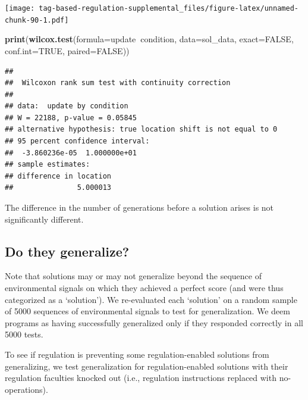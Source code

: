 \documentclass[]{book}
\newenvironment{Shaded}{\begin{snugshade}}{\end{snugshade}}
\newcommand{\DataTypeTok}[1]{\textcolor[rgb]{0.13,0.29,0.53}{#1}}
\newcommand{\KeywordTok}[1]{\textcolor[rgb]{0.13,0.29,0.53}{\textbf{#1}}}
\newcommand{\NormalTok}[1]{#1}
\newcommand{\OperatorTok}[1]{\textcolor[rgb]{0.81,0.36,0.00}{\textbf{#1}}}
\newcommand{\OtherTok}[1]{\textcolor[rgb]{0.56,0.35,0.01}{#1}}
\begin{document}
\texttt{[image: tag-based-regulation-supplemental\_files/figure-latex/unnamed-chunk-90-1.pdf]}

\begin{Shaded}
\begin{Highlighting}[]
\KeywordTok{print}\NormalTok{(}\KeywordTok{wilcox.test}\NormalTok{(}\DataTypeTok{formula=}\NormalTok{update}\OperatorTok{~}\NormalTok{condition, }\DataTypeTok{data=}\NormalTok{sol_data, }\DataTypeTok{exact=}\OtherTok{FALSE}\NormalTok{, }\DataTypeTok{conf.int=}\OtherTok{TRUE}\NormalTok{, }\DataTypeTok{paired=}\OtherTok{FALSE}\NormalTok{))}
\end{Highlighting}
\end{Shaded}

\begin{verbatim}
## 
##  Wilcoxon rank sum test with continuity correction
## 
## data:  update by condition
## W = 22188, p-value = 0.05845
## alternative hypothesis: true location shift is not equal to 0
## 95 percent confidence interval:
##  -3.860236e-05  1.000000e+01
## sample estimates:
## difference in location 
##               5.000013
\end{verbatim}

The difference in the number of generations before a solution arises is not significantly different.

\hypertarget{do-they-generalize}{%
\subsection{Do they generalize?}\label{do-they-generalize}}

Note that solutions may or may not generalize beyond the sequence of environmental signals on which they achieved a perfect score (and were thus categorized as a `solution').
We re-evaluated each `solution' on a random sample of 5000 sequences of environmental signals to test for generalization.
We deem programs as having successfully generalized only if they responded correctly in all 5000 tests.

To see if regulation is preventing some regulation-enabled solutions from generalizing, we test generalization for regulation-enabled solutions with their regulation faculties knocked out (i.e., regulation instructions replaced with no-operations).
\end{document}
